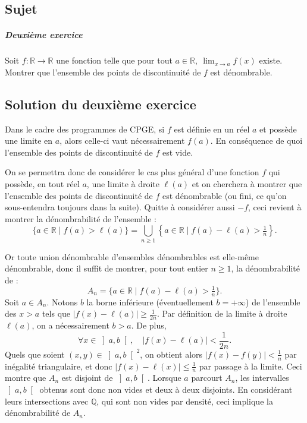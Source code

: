 \chapter{}

\section{Sujet}

\paragraph{Deuxième exercice}

Soit $f : \mathbb R \to \mathbb R$ une fonction telle que pour tout $a \in \mathbb R,\ \lim_{x\to a} f(x)$ existe.
Montrer que l'ensemble des points de discontinuité de $f$ est dénombrable.

\section{Solution du deuxième exercice} %

Dans le cadre des programmes de CPGE, si $f$ est définie en un réel $a$ et possède une limite en $a$, alors celle-ci vaut nécessairement $f(a)$. En conséquence de quoi l'ensemble des points de discontinuité de $f$ est vide.

On se permettra donc de considérer le cas plus général d'une fonction $f$ qui possède, en tout réel $a$, une limite à droite $\ell(a)$ et on cherchera à montrer que l'ensemble des points de discontinuité de $f$ est dénombrable (ou fini, ce qu'on sous-entendra toujours dans la suite). Quitte à considérer aussi $-f$, ceci revient à montrer la dénombrabilité de l'ensemble :
\[
\{a \in \mathbb R \mid f(a) > \ell(a)\} = \bigcup_{n\geqslant 1} \left\{a \in \mathbb R \mid f(a) - \ell(a) > \tfrac1n\right\}.
\]

Or toute union dénombrable d'ensembles dénombrables est elle-même dénombrable, donc il suffit de montrer, pour tout entier $n \geqslant 1$, la dénombrabilité de :
\[
A_n = \{a \in \mathbb R \mid f(a) - \ell(a) > \tfrac1n\}.
\]
Soit $a \in A_n$. Notons $b$ la borne inférieure (éventuellement $b = +\infty$) de l'ensemble des $x > a$ tels que $|f(x) - \ell(a)| \geqslant \frac1{2n}$. Par définition de la limite à droite $\ell(a)$, on a nécessairement $b > a$. De plus,
\[
\forall x \in \left]a,b\right[,\quad |f(x) - \ell(a)| < \frac1{2n}.
\]
Quels que soient $(x,y) \in \left]a,b\right[^2$, on obtient alors $|f(x)-f(y)| < \frac1n$ par inégalité triangulaire, et donc $|f(x) - \ell(x)| \leqslant \frac1n$ par passage à la limite. Ceci montre que $A_n$ est disjoint de $\left]a,b\right[$.
Lorsque $a$ parcourt $A_n$, les intervalles $\left]a,b\right[$ obtenus sont donc non vides et deux à deux disjoints. En considérant leurs intersections avec $\mathbb Q$, qui sont non vides par densité, ceci implique la dénombrabilité de $A_n$.


